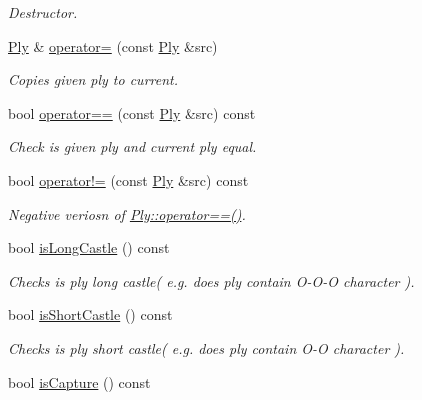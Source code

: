 \begin{DoxyCompactItemize}
\begin{DoxyCompactList}\small\item\em Destructor. \item\end{DoxyCompactList}\item 
\hyperlink{classpgn_1_1Ply}{Ply} \& \hyperlink{classpgn_1_1Ply_a2bd416f02a015a5c4a30e3992a1e8dc9}{operator=} (const \hyperlink{classpgn_1_1Ply}{Ply} \&src)
\begin{DoxyCompactList}\small\item\em Copies given ply to current. \item\end{DoxyCompactList}\item 
bool \hyperlink{classpgn_1_1Ply_a995c0362b3de149a285585eccd7b6893}{operator==} (const \hyperlink{classpgn_1_1Ply}{Ply} \&src) const 
\begin{DoxyCompactList}\small\item\em Check is given ply and current ply equal. \item\end{DoxyCompactList}\item 
bool \hyperlink{classpgn_1_1Ply_a57bbef4d69303dbed338d6b3465ded21}{operator!=} (const \hyperlink{classpgn_1_1Ply}{Ply} \&src) const 
\begin{DoxyCompactList}\small\item\em Negative veriosn of \hyperlink{classpgn_1_1Ply_a995c0362b3de149a285585eccd7b6893}{Ply::operator==()}. \item\end{DoxyCompactList}\item 
bool \hyperlink{classpgn_1_1Ply_a510f52389e06454f6187ce3dbd4415ea}{isLongCastle} () const 
\begin{DoxyCompactList}\small\item\em Checks is ply long castle( e.g. does ply contain O-\/O-\/O character ). \item\end{DoxyCompactList}\item 
bool \hyperlink{classpgn_1_1Ply_a990edff208883efc0347664530e1a590}{isShortCastle} () const 
\begin{DoxyCompactList}\small\item\em Checks is ply short castle( e.g. does ply contain O-\/O character ). \item\end{DoxyCompactList}\item 
bool \hyperlink{classpgn_1_1Ply_a0e5adc12ff755af200466885a5158154}{isCapture} () const 

\end{DoxyCompactItemize}
